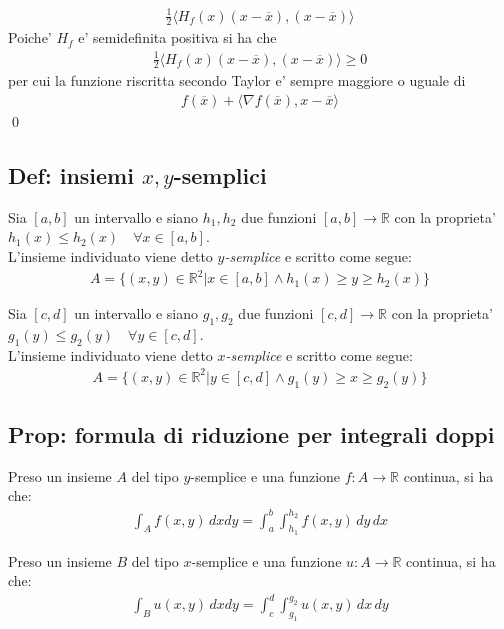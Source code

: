 \documentclass{article}
\begin{document}
\begin{itemize}
\begin{align*}
      \frac{1}{2} \langle H_f(x) (x-\overline{x}), (x-\overline{x}) \rangle
    \end{align*}
    Poiche' $H_f$ e' semidefinita positiva si ha che
    \begin{align*}
      \frac{1}{2} \langle H_f(x) (x-\overline{x}), (x-\overline{x}) \rangle \geq 0
    \end{align*}
    per cui la funzione riscritta secondo Taylor e' sempre maggiore o uguale di
    \begin{align*}
      f(\overline{x}) + \langle \nabla f(\overline{x}), x - \overline{x} \rangle
    \end{align*}
    \qed
\end{itemize}

\subsection{Def: insiemi $x,y$-semplici}

Sia $[a,b]$ un intervallo e siano $h_1, h_2$ due funzioni $[a,b] \to \mathbb{R}$ con
la proprieta' $h_1(x) \leq h_2(x) \quad \forall x \in [a,b]$. \\
L'insieme individuato viene detto \emph{$y$-semplice} e scritto come segue:
\begin{align*}
  A = \{ (x, y) \in \mathbb{R}^2 | x \in [a,b] \wedge h_1(x) \geq y \geq h_2(x) \}
\end{align*}

\noindent Sia $[c,d]$ un intervallo e siano $g_1, g_2$ due funzioni $[c,d] \to \mathbb{R}$ con
la proprieta' $g_1(y) \leq g_2(y) \quad \forall y \in [c,d]$. \\
L'insieme individuato viene detto \emph{$x$-semplice} e scritto come segue:
\begin{align*}
  A = \{ (x, y) \in \mathbb{R}^2 | y \in [c,d] \wedge g_1(y) \geq x \geq g_2(y) \}
\end{align*}

\subsection{Prop: formula di riduzione per integrali doppi}

Preso un insieme $A$ del tipo $y$-semplice e una funzione
$f: A \to \mathbb{R}$ continua, si ha che:
\begin{align*}
  \int_A f(x,y) \, dx dy = \int_a^b \int_{h_1}^{h_2} f(x,y) \, dy \, dx
\end{align*}

\noindent Preso un insieme $B$ del tipo $x$-semplice e una funzione
$u: A \to \mathbb{R}$ continua, si ha che:
\begin{align*}
  \int_B u(x,y) \, dx dy = \int_c^d \int_{g_1}^{g_2} u(x,y) \, dx \, dy
\end{align*}
\end{document}
